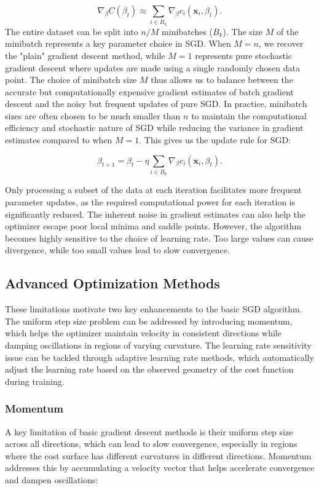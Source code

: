 \documentclass[aps,pra,english,notitlepage,reprint,nofootinbib]{revtex4-1}  %
\begin{document}
\begin{equation}
    \nabla_\beta C(\beta_t) \approx \sum_{i \in B_k}\nabla_\beta c_i(\mathbf{x}_i, \beta_t).
\end{equation}
The entire dataset can be split into \( n/M \) minibatches (\( B_k \)). The size \( M \) of the minibatch represents a key parameter choice in SGD. When \( M = n \), we recover the "plain" gradient descent method, while \( M = 1 \) represents pure stochastic gradient descent where updates are made using a single randomly chosen data point. The choice of minibatch size \( M \) thus allows us to balance between the accurate but computationally expensive gradient estimates of batch gradient descent and the noisy but frequent updates of pure SGD. In practice, minibatch sizes are often chosen to be much smaller than \( n \) to maintain the computational efficiency and stochastic nature of SGD while reducing the variance in gradient estimates compared to when \( M = 1 \). This gives us the update rule for SGD:

\begin{equation}
    \beta_{t+1} = \beta_t - \eta \sum_{i \in B_k} \nabla_\beta c_i(\mathbf{x}_i, \beta_t).
\end{equation}

Only processing a subset of the data at each iteration facilitates more frequent parameter updates, as the required computational power for each iteration is significantly reduced. The inherent noise in gradient estimates can also help the optimizer escape poor local minima and saddle points. However, the algorithm becomes highly sensitive to the choice of learning rate. Too large values can cause divergence, while too small values lead to slow convergence.

\subsection{Advanced Optimization Methods}

These limitations motivate two key enhancements to the basic SGD algorithm. The uniform step size problem can be addressed by introducing momentum, which helps the optimizer maintain velocity in consistent directions while damping oscillations in regions of varying curvature. The learning rate sensitivity issue can be tackled through adaptive learning rate methods, which automatically adjust the learning rate based on the observed geometry of the cost function during training.

\subsubsection{Momentum}
A key limitation of basic gradient descent methods is their uniform step size across all directions, which can lead to slow convergence, especially in regions where the cost surface has different curvatures in different directions. Momentum addresses this by accumulating a velocity vector that helps accelerate convergence and dampen oscillations:
\end{document}
